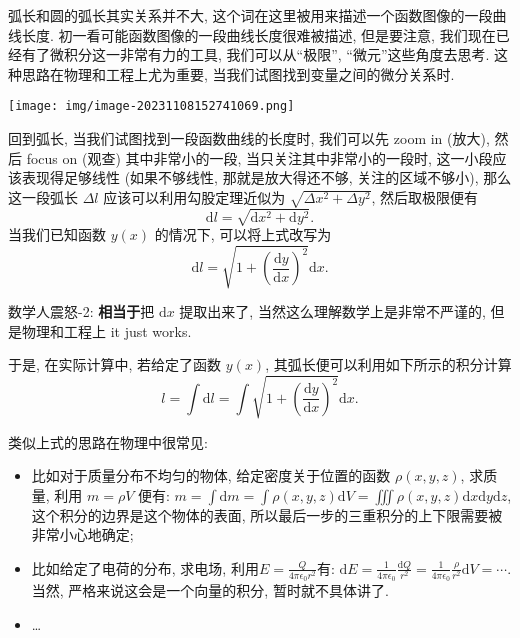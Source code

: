 \begin{tcolorbox}[size=fbox, breakable, enhanced jigsaw, title={弧长 (arc length)}]

弧长和圆的弧长其实关系并不大,
这个词在这里被用来描述一个函数图像的一段曲线长度.
初一看可能函数图像的一段曲线长度很难被描述, 但是要注意,
我们现在已经有了微积分这一非常有力的工具, 我们可以从``极限'',
``微元''这些角度去思考. 这种思路在物理和工程上尤为重要,
当我们试图找到变量之间的微分关系时.

\begin{tcolorbox}[size=fbox, breakable, enhanced jigsaw]
  \texttt{[image: img/image-20231108152741069.png]}
\end{tcolorbox}

回到弧长, 当我们试图找到一段函数曲线的长度时, 我们可以先 zoom in (放大),
然后 focus on (观查) 其中非常小的一段, 当只关注其中非常小的一段时,
这一小段应该表现得足够线性 (如果不够线性, 那就是放大得还不够,
关注的区域不够小), 那么这一段弧长 \(\Delta l\)
应该可以利用勾股定理近似为 \(\sqrt{\Delta x^2+\Delta y^2}\),
然后取极限便有 \[
\boxed{\mathrm{d}l=\sqrt{\mathrm{d}x^2+\mathrm{d}y^2}}.
\] 当我们已知函数 \(y(x)\) 的情况下, 可以将上式改写为 \[
\mathrm{d}l=\sqrt{1+\left(\frac{\mathrm{d}y}{\mathrm{d}x}\right)^2}\mathrm{d}x.
\]

\begin{newquote}
数学人震怒-2: \textbf{相当于}把 \(\mathrm{d}x\) 提取出来了,
当然这么理解数学上是非常不严谨的, 但是物理和工程上 it just works.
\end{newquote}

于是, 在实际计算中, 若给定了函数 \(y(x)\),
其弧长便可以利用如下所示的积分计算 \[
l=\int\mathrm{d}l=\int\sqrt{1+\left(\frac{\mathrm{d}y}{\mathrm{d}x}\right)^2}\mathrm{d}x.
\]

\begin{newquote}
类似上式的思路在物理中很常见:

\begin{itemize}
\item
  比如对于质量分布不均匀的物体, 给定密度关于位置的函数 \(\rho(x,y,z)\),
  求质量, 利用 \(m=\rho V\) 便有:
  \(m=\int\mathrm{d}m=\int\rho(x,y,z)\mathrm{d}V=\iiint\rho(x,y,z)\mathrm{d}x\mathrm{d}y\mathrm{d}z\),
  这个积分的边界是这个物体的表面,
  所以最后一步的三重积分的上下限需要被非常小心地确定;
\item
  比如给定了电荷的分布, 求电场,
  利用\(E=\frac{Q}{4\pi\epsilon_0 r^2}\)有:
  \(\mathrm{d}E=\frac{1}{4\pi\epsilon_0}\frac{\mathrm{d}Q}{r^2}=\frac{1}{4\pi\epsilon_0}\frac{\rho}{r^2}\mathrm{d}V=\cdots\).
  当然, 严格来说这会是一个向量的积分, 暂时就不具体讲了.
\item
  \ldots{}
\end{itemize}


\end{newquote}
\end{tcolorbox}
